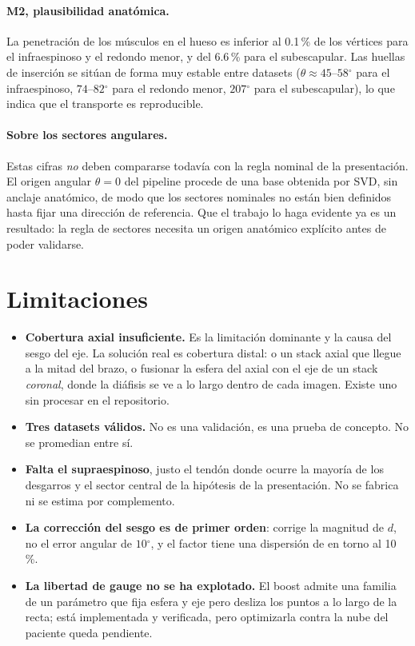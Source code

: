 \documentclass[11pt,a4paper]{article}
\providecommand{\degree}{\ensuremath{^\circ}}
\begin{document}
\paragraph{M2, plausibilidad anatómica.} La penetración de los músculos en el hueso es
inferior al 0.1\,\% de los vértices para el infraespinoso y el redondo menor, y del 6.6\,\%
para el subescapular. Las huellas de inserción se sitúan de forma muy estable entre datasets
($\theta \approx 45$--$58\degree$ para el infraespinoso, $74$--$82\degree$ para el redondo
menor, $207\degree$ para el subescapular), lo que indica que el transporte es reproducible.

\paragraph{Sobre los sectores angulares.} Estas cifras \emph{no} deben compararse todavía con
la regla nominal de la presentación. El origen angular $\theta = 0$ del pipeline procede de
una base obtenida por SVD, sin anclaje anatómico, de modo que los sectores nominales no están
bien definidos hasta fijar una dirección de referencia. Que el trabajo lo haga evidente ya es
un resultado: la regla de sectores necesita un origen anatómico explícito antes de poder
validarse.

\section{Limitaciones}

\begin{itemize}[leftmargin=1.2em,itemsep=2pt]
\item \textbf{Cobertura axial insuficiente.} Es la limitación dominante y la causa del sesgo
del eje. La solución real es cobertura distal: o un stack axial que llegue a la mitad del
brazo, o fusionar la esfera del axial con el eje de un stack \emph{coronal}, donde la
diáfisis se ve a lo largo dentro de cada imagen. Existe uno sin procesar en el repositorio.
\item \textbf{Tres datasets válidos.} No es una validación, es una prueba de concepto. No se
promedian entre sí.
\item \textbf{Falta el supraespinoso}, justo el tendón donde ocurre la mayoría de los
desgarros y el sector central de la hipótesis de la presentación. No se fabrica ni se estima
por complemento.
\item \textbf{La corrección del sesgo es de primer orden}: corrige la magnitud de $d$, no el
error angular de $10\degree$, y el factor tiene una dispersión de en torno al 10\,\%.
\item \textbf{La libertad de gauge no se ha explotado.} El boost admite una familia de un
parámetro que fija esfera y eje pero desliza los puntos a lo largo de la recta; está
implementada y verificada, pero optimizarla contra la nube del paciente queda pendiente.
\end{itemize}
\end{document}
